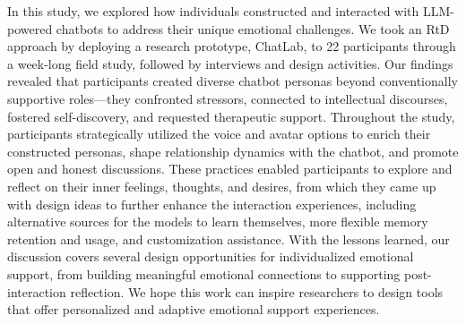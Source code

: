 In this study, we explored how individuals constructed and interacted with LLM-powered chatbots to address their unique emotional challenges. 
We took an RtD approach by deploying a research prototype, ChatLab, to 22 participants through a week-long field study, followed by interviews and design activities. 
Our findings revealed that participants created diverse chatbot personas beyond conventionally supportive roles---they confronted stressors, connected to intellectual discourses, fostered self-discovery, and requested therapeutic support.
Throughout the study, participants strategically utilized the voice and avatar options to enrich their constructed personas, shape relationship dynamics with the chatbot, and promote open and honest discussions. These practices enabled participants to explore and reflect on their inner feelings, thoughts, and desires, from which they came up with design ideas to further enhance the interaction experiences, including alternative sources for the models to learn themselves, more flexible memory retention and usage, and customization assistance. 
With the lessons learned, our discussion covers several design opportunities for individualized emotional support, from building meaningful emotional connections to supporting post-interaction reflection.
We hope this work can inspire researchers to design tools that offer personalized and adaptive emotional support experiences.

